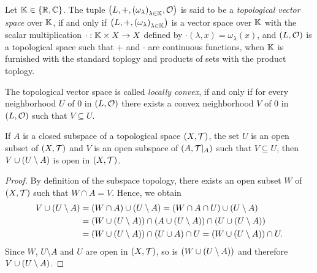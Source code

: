 \begin{definition}
	Let $\mathbb K \in {\left \{ \mathbb R, \mathbb C\right \}}$. The tuple $\tvspace{\K}$ is said to be a \textit{topological vector space} over $\mathbb K$, if and only if ${\left ( L, +, {\left ( \omega_\lambda \right )}_{\lambda \in \mathbb K} \right )}$ is a vector space over $\mathbb K$ with the scalar multiplication $\cdot: \mathbb K \times X \to X$ defined by $\cdot(\lambda, x) = \omega_\lambda(x)$, and $\tspace[L][O]$ is a topological space such that $+$ and $\cdot$ are continuous functions, when $\mathbb K$ is furnished with the standard toplogy and products of sets with the product toplogy.
	
	The topological vector space is called \textit{locally convex}, if and only if for every neighborhood $U$ of $0$ in $\tspace[L][O]$ there exists a convex neighborhood $V$ of $0$ in $\tspace[L][O]$ such that $V \subseteq U$.  
\end{definition}

\begin{lemma} \label{lemma:set_is_open}
	If $A$ is a closed subspace of a topological space $\tspace$, the set $U$ is an open subset of $\tspace$ and $V$ is an open subspace of $\reltspace$ such that $V \subseteq U$, then $V \cup {\left ( U \setminus A \right )}$ is open in $\tspace$. 
\end{lemma}
\begin{proof}
	By definition of the subspace topology, there exists an open subset $W$ of $\tspace$ such that $W \cap A = V$. Hence, we obtain
	\begin{align*}
	V \cup {\left ( U \setminus A \right )} &= {\left ( W \cap A \right )} \cup {\left ( U \setminus A \right )} = {\left ( W \cap A \cap U \right )} \cup {\left ( U \setminus A \right )} \\
	&= {\left ( W \cup {\left ( U \setminus A \right )} \right )} \cap {\left ( A \cup {\left ( U \setminus A \right )} \right )} \cap {\left ( U \cup {\left ( U \setminus A \right )} \right )} \\
	&= {\left ( W \cup {\left ( U \setminus A \right )} \right )} \cap {\left ( U \cup A \right )} \cap U = {\left ( W \cup {\left ( U \setminus A \right )} \right )} \cap U.
	\end{align*}
	Since $W$, $U \setminus A$ and $U$ are open in $\tspace$, so is ${\left ( W \cup {\left ( U \setminus A \right )} \right )}$ and therefore $V \cup {\left ( U \setminus A \right )}$. 
\end{proof}

